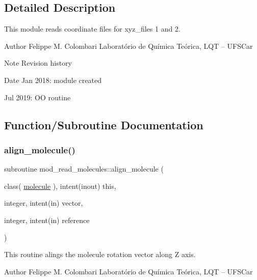 \subsection{Detailed Description}
This module reads coordinate files for xyz\+\_\+files 1 and 2. 

\begin{DoxyAuthor}{Author}
Felippe M. Colombari Laboratório de Química Teórica, L\+QT -- U\+F\+S\+Car 
\end{DoxyAuthor}
\begin{DoxyNote}{Note}
Revision history 
\end{DoxyNote}
\begin{DoxyDate}{Date}
Jan 2018\+: module created 

Jul 2019\+: OO routine 
\end{DoxyDate}


\subsection{Function/\+Subroutine Documentation}
\mbox{\label{namespacemod__read__molecules_ae228ade0f7ea15cdb9d186848ae4eae7}} 
\subsubsection{\texorpdfstring{align\+\_\+molecule()}{align\_molecule()}}
{\footnotesize\ttfamily subroutine mod\+\_\+read\+\_\+molecules\+::align\+\_\+molecule (\begin{DoxyParamCaption}\item[{class( \hyperlink{structmod__read__molecules_1_1molecule}{molecule} ), intent(inout)}]{this,  }\item[{integer, intent(in)}]{vector,  }\item[{integer, intent(in)}]{reference }\end{DoxyParamCaption})}



This routine alings the molecule rotation vector along Z axis. 

\begin{DoxyAuthor}{Author}
Felippe M. Colombari Laboratório de Química Teórica, L\+QT -- U\+F\+S\+Car 
\end{DoxyAuthor}


